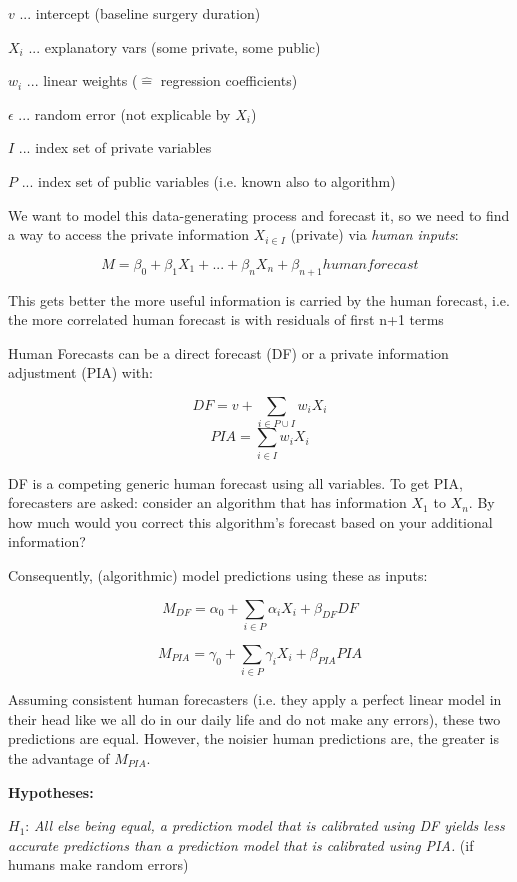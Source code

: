 \documentclass[12pt,a4paper]{article}
\begin{document}
$v$ ... intercept (baseline surgery duration)

$X_i$ ... explanatory vars (some private, some public)

$w_i$ ... linear weights ($\hat{=}$ regression coefficients)

$\epsilon$ ... random error (not explicable by $X_i$)

$I$ ... index set of private variables

$P$ ...  index set of public variables (i.e. known also to algorithm)     


We want to model this data-generating process and forecast it, so we need to find a way to access the private information $X_{i \in I}$ (private) via \emph{human inputs}:
	
\[M = \beta_0 + \beta_1 X_1 + ... + \beta_n X_n + \beta_{n+1} humanforecast\]

This gets better the more useful information is carried by the human forecast, i.e. the more correlated human forecast is with residuals of first n+1 terms

Human Forecasts can be a direct forecast (DF) or a private information adjustment (PIA) with:

\[DF = v + \sum_{i \in P \cup I} w_i X_i\]
\[PIA = \sum_{i \in I} w_i X_i\]

DF is a competing generic human forecast using all variables. To get PIA, forecasters are asked: consider an algorithm that has information $X_1$ to $X_n$. By how much would you correct this algorithm's forecast based on your additional information?

Consequently, (algorithmic) model predictions using these as inputs:

\[M_{DF} = \alpha_0 + \sum_{i \in P} \alpha_i X_i + \beta_{DF} DF\]

\[M_{PIA} = \gamma_0 + \sum_{i \in P} \gamma_i X_i + \beta_{PIA} PIA\]

Assuming consistent human forecasters (i.e. they apply a perfect linear model in their head like we all do in our daily life and do not make any errors), these two predictions are equal. However, the noisier human predictions are, the greater is the advantage of $M_{PIA}$.    

\textbf{Hypotheses:} 

$H_1$: \emph{All else being equal, a prediction model that
is calibrated using DF yields less accurate predictions than a
prediction model that is calibrated using PIA.} (if humans make random errors)
\end{document}
